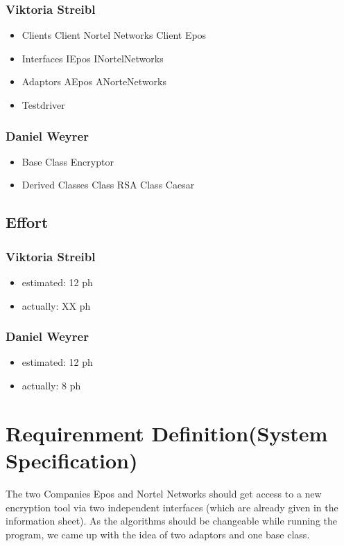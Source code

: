 \subsubsection{Viktoria Streibl}
\begin{itemize}
	\item Clients
	\subitem Client Nortel Networks
	\subitem Client Epos

	\item Interfaces
	\subitem IEpos
	\subitem INortelNetworks

	\item Adaptors
	\subitem AEpos
	\subitem ANorteNetworks
		
	\item Testdriver
	
\end{itemize}

\subsubsection{Daniel Weyrer}
\begin{itemize}
	\item Base Class Encryptor
	\item Derived Classes
		\subitem Class RSA
		\subitem Class Caesar
\end{itemize}

\subsection{Effort}

\subsubsection {Viktoria Streibl}
\begin{itemize}
	\item estimated: 12 ph 
	\item actually: XX ph
\end{itemize}

\subsubsection {Daniel Weyrer}
\begin{itemize}
	\item estimated: 12 ph 
	\item actually: 8 ph
\end{itemize}

\section{Requirenment Definition(System Specification)}
The two Companies Epos and Nortel Networks should get access to a new encryption tool via two independent interfaces (which are already given in the information sheet). As the algorithms should be changeable while running the program, we came up with the idea of two adaptors and one base class.


